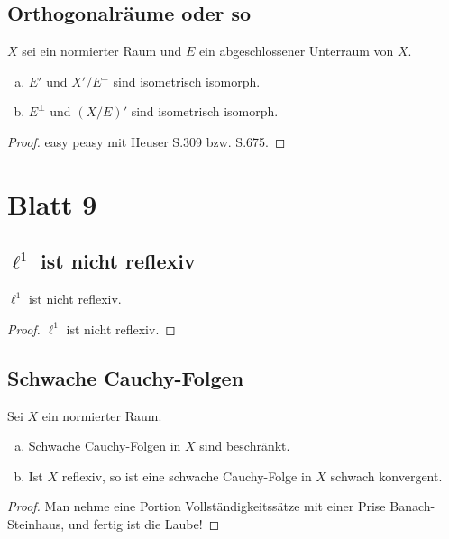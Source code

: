 \documentclass[FunkAnaskriptSS2017.tex]{subfiles}
\begin{document}
\subsection{ Orthogonalräume oder so}
\label{B8.4}
	$X$ sei ein normierter Raum und $E$ ein abgeschlossener Unterraum von $X$.
	\begin{enumerate}[(a)]
		\item $E'$ und $X'/E^\perp$ sind isometrisch isomorph.
		\item $E^\perp$ und $(X/E)'$ sind isometrisch isomorph.
	\end{enumerate}
	
	\begin{proof}
	easy peasy mit Heuser S.309 bzw. S.675.
	\end{proof}


\newpage 
\section{ Blatt 9}

\subsection{ $\ell^1$ ist nicht reflexiv}
\label{B9.1}
	$\ell^1$ ist nicht reflexiv.
	
	\begin{proof}
	$\ell^1$ ist nicht reflexiv.
	\end{proof}


\subsection{ Schwache Cauchy-Folgen}
\label{B9.2}
	Sei $X$ ein normierter Raum.
	\begin{enumerate}[(a)]
	\item Schwache Cauchy-Folgen in $X$ sind beschränkt.
	\item Ist $X$ reflexiv, so ist eine schwache Cauchy-Folge in $X$ schwach konvergent.	
	\end{enumerate}	 

	\begin{proof}
	Man nehme eine Portion Vollständigkeitssätze mit einer Prise Banach-Steinhaus, und fertig ist die Laube!
	\end{proof}
	
\end{document}

